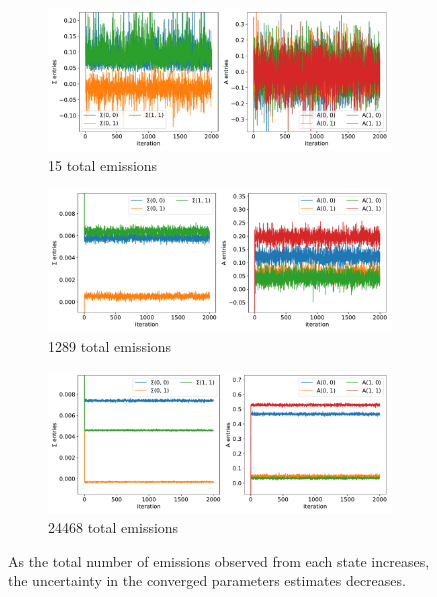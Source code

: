 \documentclass{article}
\begin{document}
  \begin{figure}[h]
  \centering
  \begin{subfigure}{0.7\textwidth}
  \includegraphics[width=\textwidth]{convergence_MET_4.pdf}
  \caption{15 total emissions}\label{fig:convergence_MET_low}
  \end{subfigure}
  \begin{subfigure}{0.7\textwidth}
  \includegraphics[width=\textwidth]{convergence_MET_21.pdf}
  \caption{1289 total emissions}\label{fig:convergence_MET_medium}
  \end{subfigure}
  \begin{subfigure}{0.7\textwidth}
  \includegraphics[width=\textwidth]{convergence_MET_15.pdf}
  \caption{24468 total emissions}\label{fig:convergence_MET_high}
  \end{subfigure}
  \caption{As the total number of emissions observed from each state
  increases, the uncertainty in the converged parameters estimates
  decreases.}\label{fig:fixed_state_convergence}
  \end{figure}
  
\end{document}
